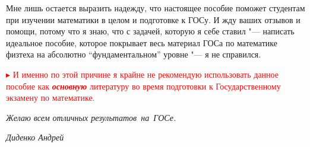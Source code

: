 Мне лишь остается выразить надежду, что настоящее пособие поможет студентам при изучении математики в целом и подготовке к ГОСу. И жду ваших отзывов и помощи, потому что я знаю, что с задачей, которую я себе ставил "--- написать идеальное пособие, которое покрывает весь материал ГОСа по математике физтеха на абсолютно ``фундаментальном'' уровне "--- я не справился.

\textcolor{red}{
$\blacktriangleright$
И именно по этой причине я крайне не рекомендую использовать данное пособие как \textit{\textbf{основную}} литературу во время подготовки к Государственному экзамену по математике.
}

\vspace*{0.7\baselineskip} 

\textit{Желаю всем отличных результатов~на~ГОСе.}

\mbox{}

\noindent\textit{Диденко Андрей}